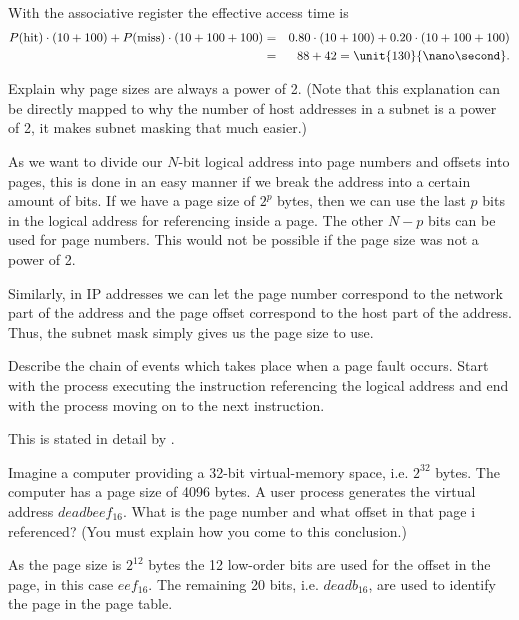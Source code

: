 \documentclass[a4paper]{miunasgn}
\theoremstyle{definition}
\begin{document}
\begin{questions}
\begin{solution}
		With the associative register the effective access time is
		\begin{eqnarray}
			P(\text{hit})\cdot (10+100) + P(\text{miss})\cdot (10+100+100) &=&
				0.80\cdot (10+100) + 0.20\cdot (10+100+100) \\
			&=& 88 + 42 = \unit{130}{\nano\second}.
		\end{eqnarray}
	\end{solution}

	\question\label{q:pagesize}
	Explain why page sizes are always a power of 2.
	(Note that this explanation can be directly mapped to why the number of host 
	addresses in a subnet is a power of 2, it makes subnet masking that much 
	easier.)
	\begin{solution}
		As we want to divide our \(N\)-bit logical address into page numbers and 
		offsets into pages, this is done in an easy manner if we break the address 
		into a certain amount of bits.
		If we have a page size of \(2^p\) bytes, then we can use the last \(p\) 
		bits in the logical address for referencing inside a page.
		The other \(N-p\) bits can be used for page numbers.
		This would not be possible if the page size was not a power of 2.

		Similarly, in IP addresses we can let the page number correspond to the 
		network part of the address and the page offset correspond to the host part 
		of the address.
		Thus, the subnet mask simply gives us the page size to use.
	\end{solution}

	
	\question\label{q:pagefaults}
	Describe the chain of events which takes place when a page fault occurs.
	Start with the process executing the instruction referencing the logical 
	address and end with the process moving on to the next instruction.
	\begin{solution}
		This is stated in detail by \citet[pp. 365-366]{Silberschatz2009osc}.
	\end{solution}

	\question\label{q:translatingaddresses}
	Imagine a computer providing a 32-bit virtual-memory space, i.e. \(2^{32}\) 
	bytes.
	The computer has a page size of 4096 bytes.
	A user process generates the virtual address \(deadbeef_{16}\).
	What is the page number and what offset in that page i referenced?
	(You must explain how you come to this conclusion.)
	\begin{solution}
		As the page size is \(2^{12}\) bytes the 12 low-order bits are used for the 
		offset in the page, in this case \(eef_{16}\).
		The remaining 20 bits, i.e. \(deadb_{16}\), are used to identify the page 
		in the page table.
	\end{solution}


\end{questions}
\end{document}
